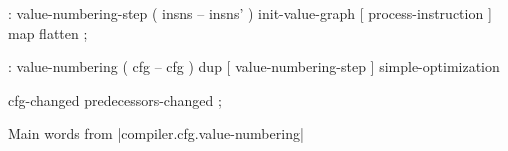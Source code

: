 \centering

  \begin{factorcode}
    : value-numbering-step ( insns -- insns' )
        init-value-graph
        [ process-instruction ] map flatten ;

    : value-numbering ( cfg -- cfg )
        dup [ value-numbering-step ] simple-optimization

        cfg-changed predecessors-changed ;
  \end{factorcode}

\caption{Main words from \factor|compiler.cfg.value-numbering|}
